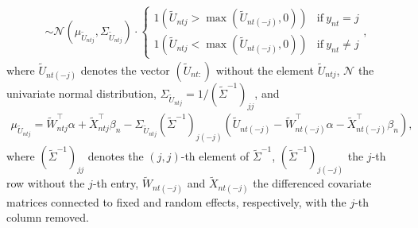 \documentclass[article,shortnames]{jss}
\begin{document}
\begin{itemize}
\begin{align*}
  \sim \mathcal{N}(\mu_{\tilde{U}_{ntj}},\Sigma_{\tilde{U}_{ntj}}) \cdot \begin{cases}
  1(\tilde{U}_{ntj}>\max(\tilde{U}_{nt(-j)},0) ) & \text{if}~ y_{nt}=j\\
  1(\tilde{U}_{ntj}<\max(\tilde{U}_{nt(-j)},0) ) & \text{if}~ y_{nt}\neq j
  \end{cases},
  \end{align*}
  where $\tilde{U}_{nt(-j)}$ denotes the vector $(\tilde{U}_{nt:})$ without the element $\tilde{U}_{ntj}$, $\mathcal{N}$ the univariate normal distribution, $\Sigma_{\tilde{U}_{ntj}} = 1/(\tilde{\Sigma}^{-1})_{jj}$, and
  \begin{align*}
  \mu_{\tilde{U}_{ntj}} = \tilde{W}_{ntj}^\top \alpha + \tilde{X}_{ntj}^\top \beta_n - \Sigma_{\tilde{U}_{ntj}} (\tilde{\Sigma}^{-1})_{j(-j)}   (\tilde{U}_{nt(-j)} - \tilde{W}_{nt(-j)}^\top \alpha - \tilde{X}_{nt(-j)}^\top \beta_n ),
  \end{align*}
  where $(\tilde{\Sigma}^{-1})_{jj}$ denotes the $(j,j)$-th element of $\tilde{\Sigma}^{-1}$, $(\tilde{\Sigma}^{-1})_{j(-j)}$ the $j$-th row without the $j$-th entry, $\tilde{W}_{nt(-j)}$ and $\tilde{X}_{nt(-j)}$ the differenced covariate matrices connected to fixed and random effects, respectively, with the $j$-th column removed.


\end{itemize}
\end{document}
